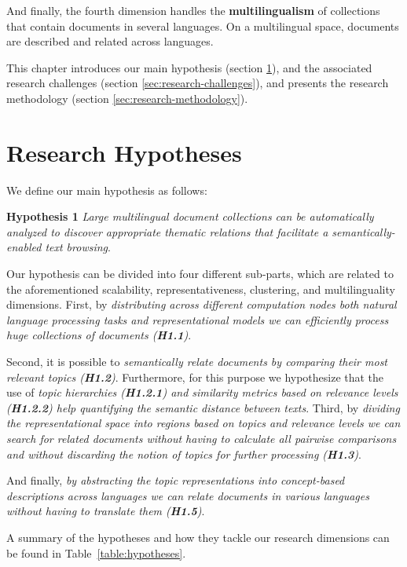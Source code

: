 And finally, the fourth dimension handles the \textbf{multilingualism} of collections that contain documents in several languages. On a multilingual space, documents are described and related across languages.

This chapter introduces our main hypothesis (section \ref{sec:research-hypothesis}), and the associated research challenges (section \ref{sec:research-challenges}), and presents the research methodology (section \ref{sec:research-methodology}).

\section{Research Hypotheses}\label{sec:research-hypothesis}

We define our main hypothesis as follows:

\textbf{Hypothesis 1} \textit{Large multilingual document collections can be automatically analyzed to discover appropriate thematic relations that facilitate a semantically-enabled text browsing}.

Our hypothesis can be divided into four different sub-parts, which are related to the aforementioned scalability, representativeness, clustering, and multilinguality dimensions. First, by \textit{distributing across different computation nodes both natural language processing tasks and representational models we can efficiently process huge collections of documents (\textbf{H1.1})}.

Second, it is possible to \textit{semantically relate documents by comparing their most relevant topics (\textbf{H1.2})}. Furthermore, for this purpose we hypothesize that the use of \textit{topic hierarchies (\textbf{H1.2.1}) and similarity metrics based on relevance levels (\textbf{H1.2.2}) help quantifying the semantic distance between texts}. Third, by \textit{dividing the representational space into regions based on topics and relevance levels we can search for related documents without having to calculate all pairwise comparisons and without discarding the notion of topics for further processing (\textbf{H1.3})}.

And finally, \textit{by abstracting the topic representations into concept-based descriptions across languages we can relate documents in various languages without having to translate them (\textbf{H1.5})}.

A summary of the hypotheses and how they tackle our research dimensions can be found in Table~\ref{table:hypotheses}.

